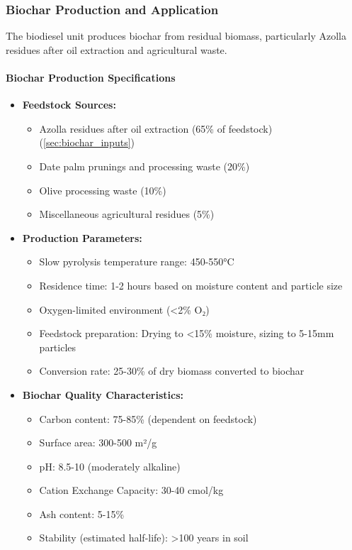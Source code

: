 \subsubsection{Biochar Production and Application}
\label{sec:biochar_production}

The biodiesel unit produces biochar from residual biomass, particularly Azolla residues after oil extraction and agricultural waste.

\paragraph{Biochar Production Specifications}
\begin{itemize}
    \item \textbf{Feedstock Sources:}
    \begin{itemize}
        \item Azolla residues after oil extraction (65\% of feedstock) (\ref{sec:biochar_inputs})
        \item Date palm prunings and processing waste (20\%)
        \item Olive processing waste (10\%)
        \item Miscellaneous agricultural residues (5\%)
    \end{itemize}
    
    \item \textbf{Production Parameters:}
    \begin{itemize}
        \item Slow pyrolysis temperature range: 450-550°C
        \item Residence time: 1-2 hours based on moisture content and particle size
        \item Oxygen-limited environment (<2\% O₂)
        \item Feedstock preparation: Drying to <15\% moisture, sizing to 5-15mm particles
        \item Conversion rate: 25-30\% of dry biomass converted to biochar
    \end{itemize}
    
    \item \textbf{Biochar Quality Characteristics:}
    \begin{itemize}
        \item Carbon content: 75-85\% (dependent on feedstock)
        \item Surface area: 300-500 m²/g
        \item pH: 8.5-10 (moderately alkaline)
        \item Cation Exchange Capacity: 30-40 cmol/kg
        \item Ash content: 5-15\%
        \item Stability (estimated half-life): >100 years in soil
    \end{itemize}
\end{itemize}


